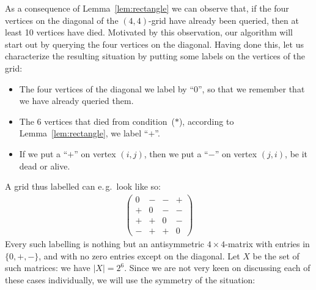 \documentclass[runningheads,a4paper]{llncs}
\begin{document}
As a consequence of Lemma~\ref{lem:rectangle} we can observe that,
if the four vertices on the diagonal of the $(4,4)$-grid have already
been queried, then at least 10 vertices have died.
Motivated by this observation, our algorithm will start out by querying
the four vertices on the diagonal.
Having done this, let us characterize the resulting situation by putting some
labels on the vertices of the grid:
\begin{itemize}
    \item
        The four vertices of the diagonal we label by ``$0$'', so that we
        remember that we have already queried them.
    \item
        The 6 vertices that died from condition~($*$), according to
        Lemma~\ref{lem:rectangle}, we label ``$+$''.
    \item
        If we put a ``$+$'' on vertex $(i,j)$, then we put a ``$-$'' on vertex
        $(j,i)$, be it dead or alive.
\end{itemize}
A grid thus labelled can e.\,g.~look like so:
\begin{align*}
    \begin{pmatrix}
        0 & - & - & +
        \\
        + & 0 & - & -
        \\
        + & + & 0 & -
        \\
        - & + & + & 0
    \end{pmatrix}
\end{align*}
Every such labelling is nothing but an antisymmetric $4 \times 4$-matrix with
entries in $\{0,+,-\}$, and with no zero entries except on the diagonal.
Let $X$ be the set of such matrices: we have $|X| = 2^6$.
Since we are not very keen on discussing each of these cases individually, we
will use the symmetry of the situation:
\end{document}
